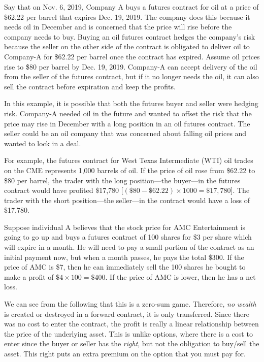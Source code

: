 \documentclass{article}
\begin{document}
    \begin{example}
      Say that on Nov. 6, 2019, Company A buys a futures contract for oil at a price of \$62.22 per barrel that expires Dec. 19, 2019. The company does this because it needs oil in December and is concerned that the price will rise before the company needs to buy. Buying an oil futures contract hedges the company's risk because the seller on the other side of the contract is obligated to deliver oil to Company-A for \$62.22 per barrel once the contract has expired. Assume oil prices rise to \$80 per barrel by Dec. 19, 2019. Company-A can accept delivery of the oil from the seller of the futures contract, but if it no longer needs the oil, it can also sell the contract before expiration and keep the profits. 

      In this example, it is possible that both the futures buyer and seller were hedging risk. Company-A needed oil in the future and wanted to offset the risk that the price may rise in December with a long position in an oil futures contract. The seller could be an oil company that was concerned about falling oil prices and wanted to lock in a deal. 

      For example, the futures contract for West Texas Intermediate (WTI) oil trades on the CME represents 1,000 barrels of oil. If the price of oil rose from \$62.22 to \$80 per barrel, the trader with the long position—the buyer—in the futures contract would have profited \$17,780 [$(\$80 - \$62.22) \times 1000 = \$17,780$]. The trader with the short position—the seller—in the contract would have a loss of \$17,780.
    \end{example}

    \begin{example}
      Suppose individual A believes that the stock price for AMC Entertainment is going to go up and buys a futures contract of 100 shares for \$3 per share which will expire in a month. He will need to pay a small portion of the contract as an initial payment now, but when a month passes, he pays the total \$300. If the price of AMC is \$7, then he can immediately sell the 100 shares he bought to make a profit of $\$4 \times 100 = \$400$. If the price of AMC is lower, then he has a net loss. 
    \end{example}

    We can see from the following that this is a zero-sum game. Therefore, \textit{no wealth} is created or destroyed in a forward contract, it is only transferred. Since there was no cost to enter the contract, the profit is really a linear relationship between the price of the underlying asset. This is unlike options, where there is a cost to enter since the buyer or seller has the \textit{right}, but not the obligation to buy/sell the asset. This right puts an extra premium on the option that you must pay for. 
\end{document}
